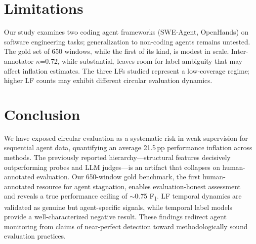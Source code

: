 \documentclass[11pt,a4paper]{article}
\newcommand{\fone}{F\textsubscript{1}}
\newcommand{\pp}{\,pp}
\begin{document}
\section{Limitations}
\label{sec:limitations}

Our study examines two coding agent frameworks (SWE-Agent, OpenHands) on software engineering tasks; generalization to non-coding agents remains untested.
The gold set of 650 windows, while the first of its kind, is modest in scale.
Inter-annotator $\kappa$=0.72, while substantial, leaves room for label ambiguity that may affect inflation estimates.
The three LFs studied represent a low-coverage regime; higher LF counts may exhibit different circular evaluation dynamics.

\section{Conclusion}
\label{sec:conclusion}

We have exposed circular evaluation as a systematic risk in weak supervision for sequential agent data, quantifying an average 21.5\pp{} performance inflation across methods.
The previously reported hierarchy---structural features decisively outperforming probes and LLM judges---is an artifact that collapses on human-annotated evaluation.
Our 650-window gold benchmark, the first human-annotated resource for agent stagnation, enables evaluation-honest assessment and reveals a true performance ceiling of $\sim$0.75 \fone{}.
LF temporal dynamics are validated as genuine but agent-specific signals, while temporal label models provide a well-characterized negative result.
These findings redirect agent monitoring from claims of near-perfect detection toward methodologically sound evaluation practices.
\end{document}
